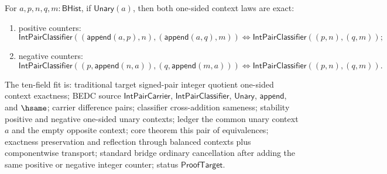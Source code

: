 \begin{theorem}
\label{thm:int-pair-classifier-one-sided-append-context-exactness}
For $a,p,n,q,m:\mathsf{BHist}$, if $\mathsf{Unary}(a)$, then both
one-sided context laws are exact:
\begin{enumerate}
\item positive counters:
$$
\mathsf{IntPairClassifier}((\mathsf{append}(a,p),n),
(\mathsf{append}(a,q),m))
\Longleftrightarrow
\mathsf{IntPairClassifier}((p,n),(q,m));
$$
\item negative counters:
$$
\mathsf{IntPairClassifier}((p,\mathsf{append}(n,a)),
(q,\mathsf{append}(m,a)))
\Longleftrightarrow
\mathsf{IntPairClassifier}((p,n),(q,m)).
$$
\end{enumerate}
The ten-field fit is: traditional target signed-pair integer quotient
one-sided context exactness; BEDC source $\mathsf{IntPairCarrier}$,
$\mathsf{IntPairClassifier}$, $\mathsf{Unary}$, $\mathsf{append}$, and
$\hsame$; carrier difference pairs; classifier cross-addition sameness;
stability positive and negative one-sided unary contexts; ledger the common
unary context $a$ and the empty opposite context; core theorem this pair of
equivalences; exactness preservation and reflection through balanced contexts
plus componentwise transport; standard bridge ordinary cancellation after
adding the same positive or negative integer counter; status
$\mathsf{ProofTarget}$.
\end{theorem}
